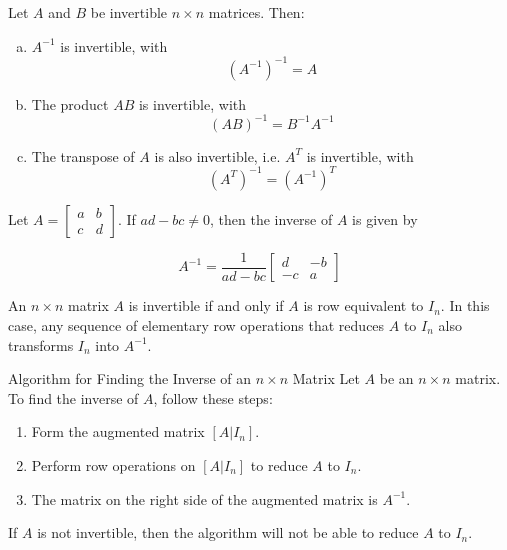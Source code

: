\begin{theorem} Let $A$ and $B$ be invertible $n \times n$ matrices. Then:
\begin{enumerate}[(a)]
    \item $A^{-1}$ is invertible, with
    \[
    \left(A^{-1}\right)^{-1}=A
    \]
    \item The product $A B$ is invertible, with
    \[
    (A B)^{-1}=B^{-1} A^{-1}
    \]
    \item The transpose of $A$ is also invertible, i.e. $A^T$ is invertible, with
    \[
    \left(A^T\right)^{-1}=\left(A^{-1}\right)^T
    \]
\end{enumerate}

\end{theorem}

\begin{theorem}
    Let $A=\left[\begin{array}{ll}
    a & b \\
    c & d
    \end{array}\right]$. If $ad-bc \neq 0$, then the inverse of $A$ is given by

    \[
    A^{-1}=\frac{1}{ad-bc}\left[\begin{array}{cc}
    d & -b \\
    -c & a
    \end{array}\right]
    \]
\end{theorem}

\begin{theorem}
    An $n \times n$ matrix $A$ is invertible if and only if $A$ is row equivalent to $I_n$. In this case, any sequence of elementary row operations that reduces $A$ to $I_n$ also transforms $I_n$ into $A^{-1}$.
\end{theorem}

\begin{custombox}{Algorithm for Finding the Inverse of an $n \times n$ Matrix}
    Let $A$ be an $n \times n$ matrix. To find the inverse of $A$, follow these steps:
    \begin{enumerate}
        \item Form the augmented matrix $[A | I_n]$.
        \item Perform row operations on $[A | I_n]$ to reduce $A$ to $I_n$.
        \item The matrix on the right side of the augmented matrix is $A^{-1}$.
    \end{enumerate}

    If $A$ is not invertible, then the algorithm will not be able to reduce $A$ to $I_n$.
\end{custombox}

